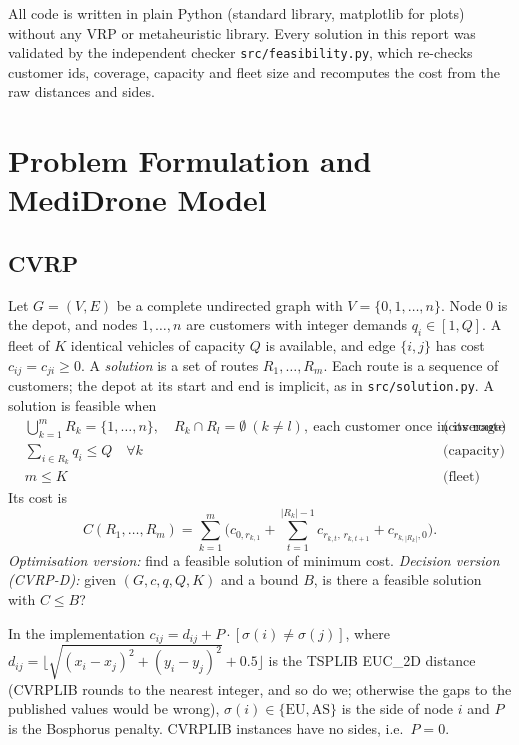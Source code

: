 \documentclass[11pt,a4paper]{article}
\theoremstyle{definition}
\theoremstyle{remark}
\newcommand{\code}[1]{\texttt{#1}}
\begin{document}
All code is written in plain Python (standard library, matplotlib for plots) without any
VRP or metaheuristic library. Every solution in this report was validated by the
independent checker \code{src/feasibility.py}, which re-checks customer ids, coverage,
capacity and fleet size and recomputes the cost from the raw distances and sides.

\section{Problem Formulation and MediDrone Model}\label{sec:model}

\subsection{CVRP}
Let $G=(V,E)$ be a complete undirected graph with $V=\{0,1,\dots,n\}$. Node $0$ is the depot,
and nodes $1,\dots,n$ are customers with integer demands $q_i \in [1,Q]$. A fleet of $K$
identical vehicles of capacity $Q$ is available, and edge $\{i,j\}$ has cost
$c_{ij}=c_{ji}\ge 0$. A \emph{solution} is a set of routes $R_1,\dots,R_m$. Each route is a
sequence of customers; the depot at its start and end is implicit, as in
\code{src/solution.py}. A solution is feasible when
\begin{align}
&\textstyle\bigcup_{k=1}^{m} R_k = \{1,\dots,n\},\quad R_k \cap R_l = \emptyset\ (k\ne l),
\ \text{each customer once in its route}
&&\text{(coverage)}\\
&\textstyle\sum_{i\in R_k} q_i \le Q \quad \forall k &&\text{(capacity)}\\
&m \le K &&\text{(fleet)}
\end{align}
Its cost is
\begin{equation}
\textstyle C(R_1,\dots,R_m) = \sum_{k=1}^{m}\Big( c_{0,r_{k,1}} + \sum_{t=1}^{|R_k|-1} c_{r_{k,t},\,r_{k,t+1}} + c_{r_{k,|R_k|},0}\Big).
\end{equation}
\emph{Optimisation version:} find a feasible solution of minimum cost.
\emph{Decision version (CVRP-D):} given $(G,c,q,Q,K)$ and a bound $B$, is there a feasible
solution with $C\le B$?

In the implementation $c_{ij} = d_{ij} + P\cdot[\sigma(i)\neq\sigma(j)]$, where
$d_{ij} = \lfloor \sqrt{(x_i-x_j)^2+(y_i-y_j)^2} + 0.5\rfloor$ is the TSPLIB EUC\_2D
distance (CVRPLIB rounds to the nearest integer, and so do we; otherwise the gaps to the
published values would be wrong), $\sigma(i)\in\{\mathrm{EU},\mathrm{AS}\}$ is the side of
node $i$ and $P$ is the Bosphorus penalty. CVRPLIB instances have no sides, i.e.\ $P=0$.
\end{document}
